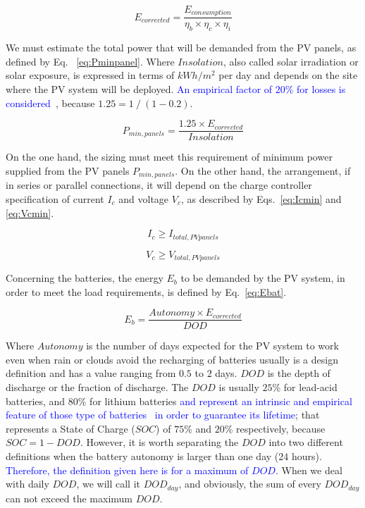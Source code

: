 \documentclass[12pt,a4paper]{article}
\begin{document}
\begin{equation}
\label{eq:Ecorrected}
E_{corrected} = \dfrac{E_{consumption}}{\eta_{b} \times \eta_{c} \times \eta_{i} }
\end{equation}

We must estimate the total power that will be demanded from the PV panels, as defined by Eq. ~\eqref{eq:Pminpanel}. Where $Insolation$, also called solar irradiation or solar exposure, is expressed in terms of $kWh/m^{2}$ per day and depends on the site where the PV system will be deployed. \textcolor{blue}{An empirical factor of $20$\% for losses is considered~\cite{Pinho}}, because $1.25 = 1 \mathbin{/} (1 - 0.2)$.

\begin{equation}
\label{eq:Pminpanel}
P_{min,panels} = \dfrac{1.25 \times E_{corrected}}{Insolation}
\end{equation}

On the one hand, the sizing must meet this requirement of minimum power supplied from the PV panels $P_{min,panels}$. On the other hand, the arrangement, if in series or parallel connections, it will depend on the charge controller specification of current $I_{c}$ and voltage $V_{c}$, as described by Eqs.~\eqref{eq:Icmin} and \eqref{eq:Vcmin}.

\begin{equation}
\label{eq:Icmin}
I_{c} \geq I_{total,PVpanels}
\end{equation}

\begin{equation}
\label{eq:Vcmin}
V_{c} \geq V_{total,PVpanels}
\end{equation}

Concerning the batteries, the energy $E_{b}$ to be demanded by the PV system, in order to meet the load requirements, is defined by Eq.~\eqref{eq:Ebat}.

\begin{equation}
\label{eq:Ebat}
E_{b} = \dfrac{Autonomy \times E_{corrected}}{DOD}
\end{equation}

\noindent Where $Autonomy$ is the number of days expected for the PV system to work even when rain or clouds avoid the recharging of batteries usually is a design definition and has a value ranging from $0.5$ to $2$ days. $DOD$ is the depth of discharge or the fraction of discharge. The $DOD$ is usually $25$\% for lead-acid batteries, and $80$\% for lithium batteries \textcolor{blue}{and represent an intrinsic and empirical feature of those type of batteries~\cite{Pinho} in order to guarantee its lifetime}; that represents a State of Charge ($SOC$) of $75$\% and $20$\% respectively, because $SOC=1-DOD$. However, it is worth separating the $DOD$ into two different definitions when the battery autonomy is larger than one day ($24$ hours). \textcolor{blue}{Therefore, the definition given here is for a maximum of $DOD$}. When we deal with daily $DOD$, we will call it $DOD_{day}$, and obviously, the sum of every $DOD_{day}$ can not exceed the maximum $DOD$.
\end{document}
